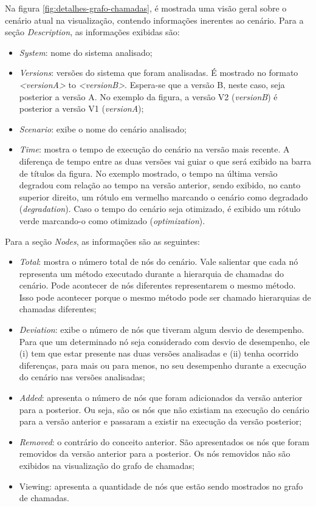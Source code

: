 Na figura \ref{fig:detalhes-grafo-chamadas}, é mostrada uma visão geral sobre o cenário atual na visualização, contendo informações inerentes ao cenário. Para a seção \textit{Description}, as informações exibidas são:
\begin{itemize}
   \item \textit{System}: nome do sistema analisado;
   \item \textit{Versions}: versões do sistema que foram analisadas. É mostrado no formato \textit{<versionA>} to \textit{<versionB>}. Espera-se que a versão B, neste caso, seja posterior a versão A. No exemplo da figura, a versão V2 (\textit{versionB}) é posterior a versão V1 (\textit{versionA});
   \item \textit{Scenario}: exibe o nome do cenário analisado;
   \item \textit{Time}: mostra o tempo de execução do cenário na versão mais recente. A diferença de tempo entre as duas versões vai guiar o que será exibido na barra de títulos da figura. No exemplo mostrado, o tempo na última versão degradou com relação ao tempo na versão anterior, sendo exibido, no canto superior direito, um rótulo em vermelho marcando o cenário como degradado (\textit{degradation}). Caso o tempo do cenário seja otimizado, é exibido um rótulo verde marcando-o como otimizado (\textit{optimization}).
\end{itemize}

Para a seção \textit{Nodes}, as informações são as seguintes:
\begin{itemize}
   \item \textit{Total}: mostra o número total de nós do cenário. Vale salientar que cada nó representa um método executado durante a hierarquia de chamadas do cenário. Pode acontecer de nós diferentes representarem o mesmo método. Isso pode acontecer porque o mesmo método pode ser chamado hierarquias de chamadas diferentes;
   \item \textit{Deviation}: exibe o número de nós que tiveram algum desvio de desempenho. Para que um determinado nó seja considerado com desvio de desempenho, ele (i) tem que estar presente nas duas versões analisadas e (ii) tenha ocorrido diferenças, para mais ou para menos, no seu desempenho durante a execução do cenário nas versões analisadas;
   \item \textit{Added}: apresenta o número de nós que foram adicionados da versão anterior para a posterior. Ou seja, são os nós que não existiam na execução do cenário para a versão anterior e passaram a existir na execução da versão posterior;
   \item \textit{Removed}: o contrário do conceito anterior. São apresentados os nós que foram removidos da versão anterior para a posterior. Os nós removidos não são exibidos na visualização do grafo de chamadas;
   \item Viewing: apresenta a quantidade de nós que estão sendo mostrados no grafo de chamadas.
\end{itemize}

